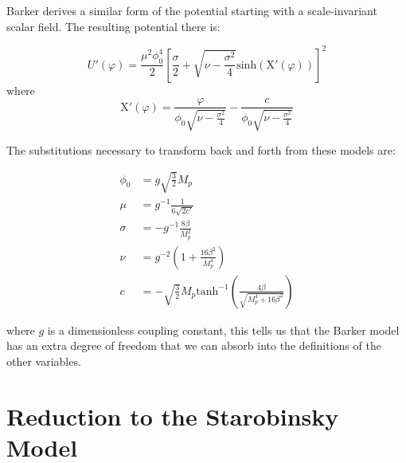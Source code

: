\documentclass[aps,prd,reprint,preprintnumbers,showpacs,floatfix,nofootinbib,superscript address]{revtex4-2}
\begin{document}
Barker \cite{barker2024poincaregaugetheoryconformal} derives a similar form of the potential starting with a scale-invariant scalar field. The resulting potential there is:

\begin{equation}
    U'(\varphi) = \frac{\mu^2 \phi_{0}^{4}}{2} \left[ \frac{\sigma}{2} + \sqrt{\nu - \frac{\sigma^2}{4}} \text{sinh}\left( \text{X}'(\varphi) \right)  \right]^2
\end{equation}
where
\begin{equation}
    \text{X}'(\varphi) =  \frac{\varphi}{\phi_0 \sqrt{\nu - \frac{\sigma^2}{4}}} - \frac{c}{\phi_0 \sqrt{\nu - \frac{\sigma^2}{4}}}
\end{equation}

The substitutions necessary to transform back and forth from these models are: 

\begin{align}
    \phi_0 &= g \sqrt{\frac{3}{2}} M_p  \nonumber \\
    \mu &= g^{-1} \frac{1}{6 \sqrt{2 c'}}  \nonumber \\
    \sigma &= - g^{-1} \frac{8 \beta}{M_{p}^{2}}  \nonumber \\
    \nu &= g^{-2} \left( 1 + \frac{16 \beta^2}{M_{p}^{4}} \right) \nonumber \\
    c  &= -\sqrt{\frac{3}{2}} M_{p} \text{tanh}^{-1} \left(\frac{4 \beta}{\sqrt{M_{p}^{4}+16 \beta^2}} \right)
\end{align}

where $g$ is a dimensionless coupling constant, this tells us that the Barker model has an extra degree of freedom that we can absorb into the definitions of the other variables.

\section{Reduction to the Starobinsky Model} \label{Appendix B}
\end{document}
